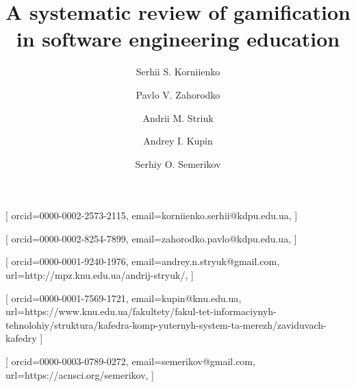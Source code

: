 \documentclass[
	hf,
	]{ceurart}
\begin{document}
	
	
	
	
	\title{A systematic review of gamification in software engineering education}

\author[1]{Serhii S. Korniienko}[%
orcid={0000-0002-2573-2115},
email={korniienko.serhii@kdpu.edu.ua},
]

\author[1]{Pavlo V. Zahorodko}[%
orcid={0000-0002-8254-7899},
email={zahorodko.pavlo@kdpu.edu.ua},
]

\address[1]{Kryvyi Rih State Pedagogical University,
	54 Universytetskyi Ave., Kryvyi Rih, 50086, Ukraine}

\address[2]{Kryvyi Rih National University, 11 Vitalii Matusevych Str., Kryvyi Rih, 50027, Ukraine}
\address[3]{Academy of Cognitive and Natural Sciences, 54 Universytetskyi Ave., Kryvyi Rih, 50086, Ukraine}


\author[2,1,3]{Andrii M. Striuk}[%
orcid=0000-0001-9240-1976,
email={andrey.n.stryuk@gmail.com},
url={http://mpz.knu.edu.ua/andrij-stryuk/},
]

\author[2]{Andrey I. Kupin}[%
orcid=0000-0001-7569-1721,
email={kupin@knu.edu.ua},
url={https://www.knu.edu.ua/fakultety/fakul-tet-informaciynyh-tehnolohiy/struktura/kafedra-komp-yuternyh-system-ta-merezh/zaviduvach-kafedry}
]

\author[1,4,5,2,3]{Serhiy O. Semerikov}[%
orcid={0000-0003-0789-0272},
email={semerikov@gmail.com},
url={https://acnsci.org/semerikov},
]

\address[4]{Institute for Digitalisation of Education of the NAES of Ukraine,
	9 M. Berlynskoho Str., Kyiv, 04060, Ukraine}
\address[5]{Zhytomyr Polytechnic State University, 103 Chudnivsyka Str., Zhytomyr, 10005, Ukraine}
\end{document}
